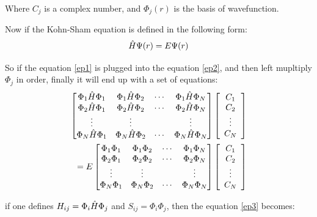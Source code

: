 \documentclass[a4paper, 12pt, titlepage,oneside,drop]{kthesis}
\begin{document}
\noindent Where $C_j$ is a complex number, and $\Phi_j (r)$ is the basis of wavefunction. 

\noindent Now if the Kohn-Sham equation is defined in the following form:
\begin{equation}\label{ep2}
 \hat{H} \Psi (r) = E \Psi (r)
\end{equation}
 
\noindent So if the equation \ref{ep1} is plugged into the equation \ref{ep2}, and then left mupltiply $\Phi_j$ in order, finally it will end up with a set of equations:
\begin{equation}\begin{split}\label{ep3}
\left[
\begin{matrix}
    \Phi_1 \hat{H} \Phi_1 & \Phi_1 \hat{H} \Phi_2 & \cdots & \Phi_1 \hat{H} \Phi_N \\
    \Phi_2 \hat{H} \Phi_1 & \Phi_2 \hat{H} \Phi_2 & \cdots & \Phi_2 \hat{H} \Phi_N \\
    \vdots               & \vdots               &        & \vdots               \\
    \Phi_N \hat{H} \Phi_1 & \Phi_N \hat{H} \Phi_2 & \cdots & \Phi_N \hat{H} \Phi_N \\
\end{matrix} \right] \left[ \begin{array}{c} C_1 \\ C_2 \\ \vdots \\ C_N\end{array} \right] \\
=E \left[
\begin{matrix}
    \Phi_1 \Phi_1 & \Phi_1 \Phi_2 & \cdots & \Phi_1 \Phi_N \\
   \Phi_2 \Phi_1 & \Phi_2 \Phi_2 & \cdots & \Phi_2 \Phi_N \\
    \vdots               & \vdots               &        & \vdots               \\
   \Phi_N \Phi_1 & \Phi_N \Phi_2 & \cdots & \Phi_N \Phi_N \\
\end{matrix} \right]\left[ \begin{array}{c} C_1 \\ C_2 \\ \vdots \\ C_N\end{array} \right]
\end{split}\end{equation}

\noindent if one defines $H_{ij} = \Phi_i \hat{H} \Phi_j$ and $S_{ij} = \Phi_i \Phi_j$, then the equation \ref{ep3} becomes:
\end{document}
